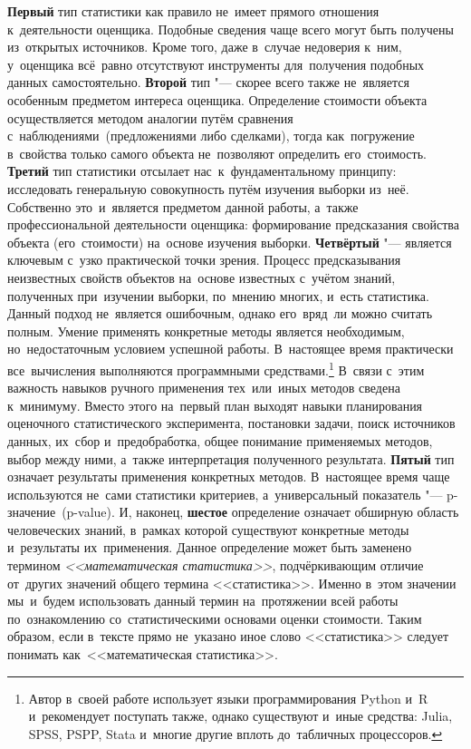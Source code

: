 \documentclass[]{scrartcl}
\begin{document}
\textbf{Первый} тип статистики как правило не~имеет прямого отношения к~деятельности оценщика. Подобные сведения чаще всего могут быть получены из~открытых источников. Кроме того, даже в~случае недоверия к~ним, у~оценщика всё~равно отсутствуют инструменты для~получения подобных данных самостоятельно. \textbf{Второй} тип "--- скорее всего также не~является особенным предметом интереса оценщика. Определение стоимости объекта осуществляется методом аналогии путём сравнения с~наблюдениями~(предложениями либо сделками), тогда как~погружение в~свойства только самого объекта не~позволяют определить его~стоимость. \textbf{Третий} тип статистики отсылает нас~к~фундаментальному принципу: исследовать генеральную совокупность путём изучения выборки из~неё. Собственно это~и~является предметом данной работы, а~также профессиональной деятельности оценщика: формирование предсказания свойства объекта (его~стоимости) на~основе изучения выборки. \textbf{Четвёртый} "--- является ключевым с~узко практической точки зрения. Процесс предсказывания неизвестных свойств объектов на~основе известных с~учётом знаний, полученных при~изучении выборки, по~мнению многих, и~есть статистика. Данный подход не~является ошибочным, однако его~вряд~ли можно считать полным. Умение применять конкретные методы является необходимым, но~недостаточным условием успешной работы. В~настоящее время практически все~вычисления выполняются программными средствами.\footnote{Автор в~своей работе использует языки программирования Python и~R и~рекомендует поступать также, однако существуют и~иные средства: Julia, SPSS, PSPP, Stata и~многие другие вплоть до~табличных процессоров.} В~связи с~этим важность навыков ручного применения тех~или~иных методов сведена к~минимуму. Вместо этого на~первый план выходят навыки планирования оценочного статистического эксперимента, постановки задачи, поиск источников данных, их~сбор и~предобработка, общее понимание применяемых методов, выбор между ними, а~также интерпретация полученного результата. \textbf{Пятый} тип означает результаты применения конкретных методов. В~настоящее время чаще используются не~сами статистики критериев, а~универсальный показатель "--- p-значение~(p-value). И, наконец, \textbf{шестое} определение означает обширную область человеческих знаний, в~рамках которой существуют конкретные методы и~результаты их~применения. Данное определение может быть заменено термином \emph{<<математическая статистика>>}, подчёркивающим отличие от~других значений общего термина <<статистика>>. Именно в~этом значении мы~и~будем использовать данный термин на~протяжении всей работы по~ознакомлению со~статистическими основами оценки стоимости. Таким образом, если в~тексте прямо не~указано иное слово <<статистика>> следует понимать как~<<математическая статистика>>.
\end{document}
